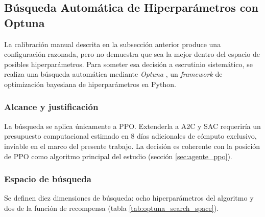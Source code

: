 \documentclass[IB,a4paper]{TFUOC}
\begin{document}
\subsection{Búsqueda Automática de Hiperparámetros con Optuna}
\label{sec:optuna_ppo}

La calibración manual descrita en la subsección anterior produce una configuración razonada, pero no demuestra que sea la mejor dentro del espacio de posibles hiperparámetros. Para someter esa decisión a escrutinio sistemático, se realiza una búsqueda automática mediante \textit{Optuna} \citep{akiba2019optuna}, un \textit{framework} de optimización bayesiana de hiperparámetros en Python.

\subsubsection*{Alcance y justificación}

La búsqueda se aplica únicamente a PPO. Extenderla a A2C y SAC requeriría un presupuesto computacional estimado en 8 días adicionales de cómputo exclusivo, inviable en el marco del presente trabajo. La decisión es coherente con la posición de PPO como algoritmo principal del estudio (sección \ref{sec:agente_ppo}).

\subsubsection*{Espacio de búsqueda}

Se definen diez dimensiones de búsqueda: ocho hiperparámetros del algoritmo y dos de la función de recompensa (tabla \ref{tab:optuna_search_space}).
\end{document}

